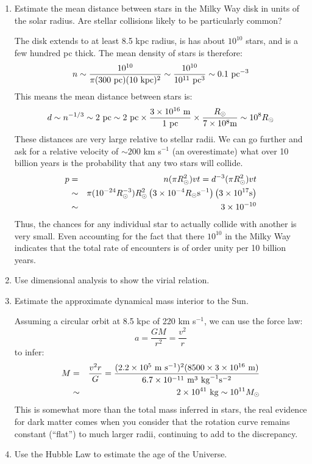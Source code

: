 \begin{enumerate} 
\item Estimate the mean distance between stars in the Milky Way disk
  in units of the solar radius. Are stellar collisions likely to be
  particularly common?

\begin{answer}
The disk extends to at least 8.5 kpc radius, is has about $10^{10}$
stars, and is a few hundred pc thick. The mean density of stars is
therefore:
\begin{equation}
n \sim \frac{10^{10}}{\pi (300 {\rm ~pc}) (10 {\rm ~kpc})^2} \sim
\frac{10^{10}}{10^{11} {\rm ~pc}^3} \sim  0.1 {\rm ~pc}^{-3} 
\end{equation}
This means the mean distance between stars is:
\begin{equation}
d \sim n^{-1/3} \sim 2 {\rm ~pc} \sim 2 {\rm ~pc} \times \frac{3 \times
  10^{16} {\rm ~m}}{1 {\rm ~pc}} \times \frac{R_\odot}{7 \times 10^8 {\rm
    m}}
\sim 10^8 R_\odot
\end{equation}
These distances are very large relative to stellar radii. We can go
further and ask for a relative velocity of $\sim 200$ km s$^{-1}$ (an
overestimate) what over 10 billion years is the probability that any
two stars will collide.
\begin{eqnarray}
  p &=& n (\pi R_\odot^2) v t = d^{-3} (\pi R_\odot^2) v t \cr
  &\sim& \pi (10^{-24} R_\odot^{-3}) R_\odot^2 \left(3 \times
  10^{-4} R_\odot {\rm s}^{-1}\right) \left(3 \times 10^{17} {\rm
    s}\right) \cr
  &\sim& 3 \times 10^{-10} 
\end{eqnarray}
Thus, the chances for any individual star to actually collide with
another is very small. Even accounting for the fact that there
$10^{10}$ in the Milky Way indicates that the total rate of encounters
is of order unity per 10 billion years.
\end{answer}
\item Use dimensional analysis to show the virial relation.
\item Estimate the approximate dynamical mass interior to the Sun. 

\begin{answer}
  Assuming a circular orbit at 8.5 kpc of 220 km s$^{-1}$, we can use
  the force law:
  \begin{equation}
   a = \frac{GM}{r^2} = \frac{v^2}{r}
  \end{equation}
  to infer:
  \begin{eqnarray}
   M &=& \frac{v^2 r}{G} =  \frac{(2.2 \times 10^5 {\rm ~m} {\rm
       ~s}^{-1})^2 (8500 \times 3 \times 10^{16} {\rm ~m})}
   {6.7 \times 10^{-11} {\rm ~m}^3 {\rm ~kg}^{-1} {\rm s}^{-2}} \cr
   &\sim& 2\times 10^{41} {\rm ~kg} \sim 10^{11} M_\odot 
  \end{eqnarray}
  This is somewhat more than the total mass inferred in stars, the
  real evidence for  dark matter comes when you consider that the
  rotation curve remains constant (``flat'') to much larger radii,
  continuing to add to the discrepancy.
\end{answer}
\item Use the Hubble Law to estimate the age of the Universe.


\end{enumerate}
